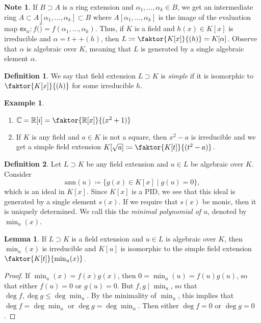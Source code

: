 \documentclass[10pt,letterpaper,cm]{nupset}
\theoremstyle{definition}
\newtheorem*{definition}{Definition}
\newtheorem{exmp}{Example}
\newtheorem{note}{Note}
\newtheorem{lemma}{Lemma}
\newcommand{\C}{\mathbb C}
\newcommand{\R}{\mathbb R}
\newcommand{\1}{\mathbf{1}}
\newcommand{\0}{\vec 0}
\begin{document}
\begin{note}
If $B \supset A$  is a ring extension and $\alpha_1, \ldots, \alpha_k \in B$, we get an intermediate ring $A \subset A[\alpha_1, \ldots, \alpha_k] \subset B$ where $A[\alpha_1, \ldots, \alpha_k] $ is the image of the evaluation map $\mathsf{ex}_{\alpha} : f(\overset{x}) = f(\alpha_1, \ldots, \alpha_k)$. Thus, if $K$ is a field and $h(x) \in K[x]$ is irreducible and $\alpha = t + +(h)$, then $L\coloneqq \faktor{K[x]}{(h)} = K[\alpha]$. Observe that $\alpha$ is algebraic over $K$, meaning that $L$ is generated by a single algebraic element $\alpha$.
\end{note}

\begin{definition}
We say that field extension $L \supset K$ is \textit{simple} if it is isomorphic to $\faktor{K[x]}{(h)}$ for some irreducible $h$.
\end{definition}

\begin{exmp} $ $
\begin{enumerate}
\item $\C = \R[i] = \faktor{\R[x]}{(x^2 +1)}$
\item If $K$ is any field and $a\in K$ is not a square, then $x^2 -a$ is irreducible and we get a simple field extension $K[\sqrt{a}] \coloneqq \faktor{K[t]}{(t^2 -a)}$.
\end{enumerate}
\end{exmp}

\begin{definition}
Let $L \supset K$ be any field extension and $u\in L$ be algebraic over $K$. Consider $$\text{ann}(u) \coloneqq  \{g(x) \in K[x] \mid g(u) =0\},$$ which is an ideal in $K[x]$. Since $K[x]$ is a PID, we see that this ideal is generated by a single element $s(x)$. If we require that $s(x)$ be monic, then it is uniquely determined. We call this the \textit{minimal polynomial of $u$}, denoted by $\min_u(x)$. 
\end{definition}

\begin{lemma}
If $L \supset K$ is a field extension and $u\in L$ is algebraic over $K$, then $\min_u(x)$ is irreducible and $K[u]$ is isomorphic to the simple field extension $\faktor{K[t]}{\min_u(x)}$.
\end{lemma}
\begin{proof}
If $\min_u(x) = f(x)g(x)$, then $0 = \min_u(u) = f(u) g(u)$, so that either $f(u) = 0$ or $g(u) =0$. But $f,g \mid \min_u$, so that $\deg{f}, \deg{g} \leq \deg{\min_u}$. By the minimality of $\min_u$, this implies that $\deg{f} = \deg{\min_u}$ or $\deg{g} = \deg{\min_u}$. Then either $\deg{f} =0$ or $\deg{g} =0$. 
\end{proof}
\end{document}
